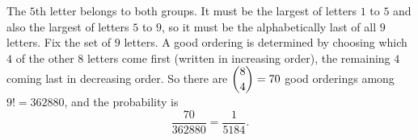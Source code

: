 The $5$th letter belongs to both groups. It must be the largest of letters $1$ to $5$ and also the largest of letters $5$ to $9$, so it must be the alphabetically last of all $9$ letters. Fix the set of $9$ letters. A good ordering is determined by choosing which $4$ of the other $8$ letters come first (written in increasing order), the remaining $4$ coming last in decreasing order. So there are $\dbinom84=70$ good orderings among $9!=362880$, and the probability is
\[
\dfrac{70}{362880}=\boxed{\dfrac{1}{5184}} .
\]
